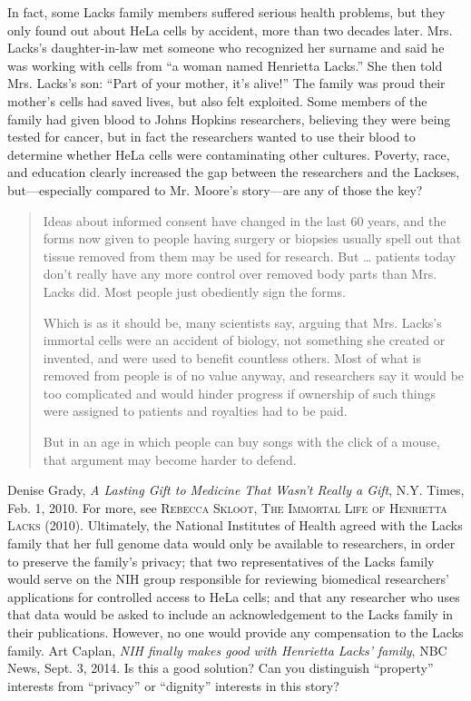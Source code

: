 In fact, some Lacks family members suffered serious health problems, but they
only found out about HeLa cells by accident, more than two decades later.  Mrs.
Lacks's daughter-in-law met someone who recognized her surname and said he was
working with cells from ``a woman named Henrietta Lacks.''  She then told Mrs.
Lacks's son: ``Part of your mother, it's alive!''  The family was proud their
mother's cells had saved lives, but also felt exploited.  Some members of the
family had given blood to Johns Hopkins researchers, believing they were being
tested for cancer, but in fact the researchers wanted to use their blood to
determine whether HeLa cells were contaminating other cultures.  Poverty, race,
and education clearly increased the gap between the researchers and the
Lackses, but---especially compared to Mr. Moore's story---are any of those
the key?
\begin{quotation}
Ideas about informed consent have changed in the last 60 years, and the forms
now given to people having surgery or biopsies usually spell out that tissue
removed from them may be used for research. But {\dots} patients today don't
really have any more control over removed body parts than Mrs. Lacks did. Most
people just obediently sign the forms.

Which is as it should be, many scientists say, arguing that Mrs. Lacks's
immortal cells were an accident of biology, not something she created or
invented, and were used to benefit countless others. Most of what is removed
from people is of no value anyway, and researchers say it would be too
complicated and would hinder progress if ownership of such things were assigned
to patients and royalties had to be paid.

But in an age in which people can buy songs with the click of a mouse, that
argument may become harder to defend.
\end{quotation}
Denise Grady,
\emph{A Lasting Gift to Medicine That Wasn't Really a Gift}, N.Y. Times, Feb. 1,
2010.
For more, see \textsc{Rebecca Skloot, The Immortal Life of Henrietta Lacks}
(2010).
Ultimately, the National Institutes of Health agreed with the Lacks family that
her full genome data would only be available to researchers, in order to
preserve the family's privacy; that two representatives of the Lacks family
would serve on the NIH group responsible for reviewing biomedical researchers'
applications for controlled access to HeLa cells; and that any researcher who
uses that data would be asked to include an acknowledgement to the Lacks family
in their publications.  However, no one would provide any compensation to the
Lacks family.  Art Caplan,
\emph{NIH
finally makes good with Henrietta Lacks' family}, NBC News, Sept. 3, 2014.
 Is this a good solution?  Can you distinguish ``property'' interests from
``privacy'' or ``dignity'' interests in this story?

